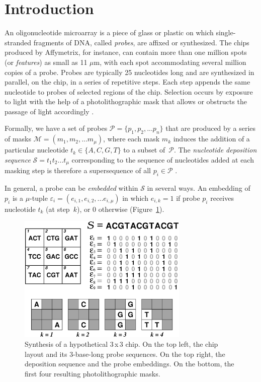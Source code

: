\documentclass{bioinfo}
\begin{document}
\section{Introduction}

An oligonucleotide microarray is a piece of glass or plastic on which single-stranded fragments of DNA, called \emph{probes}, are affixed or synthesized. The chips produced by Affymetrix, for instance, can contain more than one million spots (or \emph{features}) as small as 11 $\mu$m, with each spot accommodating several million copies of a probe. Probes are typically 25 nucleotides long and are synthesized in parallel, on the chip, in a series of repetitive steps. Each step appends the same nucleotide to probes of selected regions of the chip. Selection occurs by exposure to light with the help of a photolithographic mask that allows or obstructs the passage of light accordingly \citep{FODOR91}.

Formally, we have a set of probes $\mathcal{P} = \{p_{1}, p_{2}, ... p_{n}\}$ that are produced by a series of masks $\mathcal{M} = (m_{1}, m_{2}, ... m_{\mu})$, where each mask $m_{k}$ induces the addition of a particular nucleotide $t_{k} \in \{A, C, G, T\}$ to a subset of~$\mathcal{P}$. The \emph{nucleotide deposition sequence} $\mathcal{S} = t_{1} t_{2} \ldots t_{\mu}$ corresponding to the sequence of nucleotides added at each masking step is therefore a supersequence of all $p_{i} \in \mathcal{P}$ \citep{RAHMANN03}.

In general, a probe can be \emph{embedded} within $\mathcal{S}$ in several ways. An embedding of $p_{i}$ is a $\mu$-tuple $\varepsilon_{i} = (e_{i,1}, e_{i,2}, ... e_{i,\mu})$ in which $e_{i,k} = 1$ if probe $p_{i}$ receives nucleotide $t_{k}$ (at step~$k$), or 0 otherwise (Figure~\ref{fig:masking_process}).

\begin{figure}
\centerline{\includegraphics[width=230pt]{chip}}
\caption{Synthesis of a hypothetical 3\,x\,3 chip. On the top left, the chip layout and its 3-base-long probe sequences. On the top right, the deposition sequence and the probe embeddings. On the bottom, the first four resulting photolithographic masks.}
\label{fig:masking_process}
\end{figure}
\end{document}
